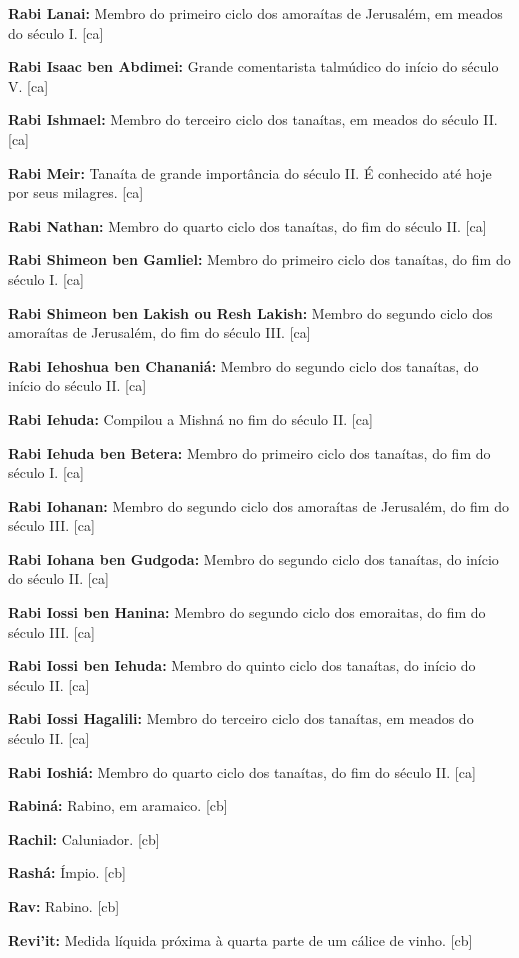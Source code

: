 \textbf{Rabi Lanai:} Membro do primeiro ciclo dos amoraítas de Jerusalém, 
em meados do século I. [ca]

\textbf{Rabi Isaac ben Abdimei:} Grande comentarista talmúdico do
início do século V. [ca]

\textbf{Rabi Ishmael:} Membro do terceiro ciclo dos tanaítas, em meados 
do século II. [ca]

\textbf{Rabi Meir:} Tanaíta de grande importância do século II. 
É conhecido até hoje por seus milagres. [ca]

\textbf{Rabi Nathan:} Membro do quarto ciclo dos tanaítas, 
do fim do século II. [ca]

\textbf{Rabi Shimeon ben Gamliel:} Membro do primeiro ciclo dos
tanaítas, do fim do século I. [ca]

\textbf{Rabi Shimeon ben Lakish ou Resh Lakish:} Membro do segundo
ciclo dos amoraítas de Jerusalém, do fim do século III. [ca]

\textbf{Rabi Iehoshua ben Chananiá:} Membro do segundo ciclo dos tanaítas, 
do início do século II. [ca]

\textbf{Rabi Iehuda:} Compilou a Mishná no fim do século II. [ca]

\textbf{Rabi Iehuda ben Betera:} Membro do primeiro ciclo dos tanaítas, do
fim do século I. [ca]

\textbf{Rabi Iohanan:} Membro do segundo ciclo dos amoraítas de Jerusalém,
do fim do século III. [ca]

\textbf{Rabi Iohana ben Gudgoda:} Membro do segundo ciclo dos tanaítas, do
início do século II. [ca]

\textbf{Rabi Iossi ben Hanina:} Membro do segundo ciclo dos emoraitas, 
do fim do século III. [ca]

\textbf{Rabi Iossi ben Iehuda:} Membro do quinto ciclo dos tanaítas, do início do
século II. [ca]

\textbf{Rabi Iossi Hagalili:} Membro do terceiro ciclo dos tanaítas, 
em meados do século II. [ca]

\textbf{Rabi Ioshiá:} Membro do quarto ciclo dos tanaítas, do fim do século II. [ca]

\textbf{Rabiná:} Rabino, em aramaico. [cb]

\textbf{Rachil:} Caluniador. [cb]

\textbf{Rashá:} Ímpio. [cb]

\textbf{Rav:} Rabino. [cb]

\textbf{Revi'it:} Medida líquida próxima à quarta parte de um cálice de vinho. [cb]

